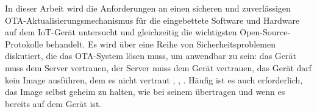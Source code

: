 In dieser Arbeit wird die Anforderungen an einen sicheren und zuverlässigen OTA-Aktualisierungsmechanismus \cite{website:SecureFirmware} für die eingebettete Software und Hardware auf dem IoT-Gerät untersucht und gleichzeitig die wichtigsten Open-Source-Protokolle behandelt. Es wird über eine Reihe von Sicherheitsproblemen diskutiert, die das OTA-System lösen muss, um anwendbar zu sein: das Gerät muss dem Server vertrauen, der Server muss dem Gerät vertrauen, das Gerät darf kein Image ausführen, dem es nicht vertraut \cite{website:Attestation}, \cite{website:Principles}, \cite{website:TrustLite}. Häufig ist es auch erforderlich, das Image selbst geheim zu halten, wie bei seinem übertragen und wenn es bereits auf dem Gerät ist. 

